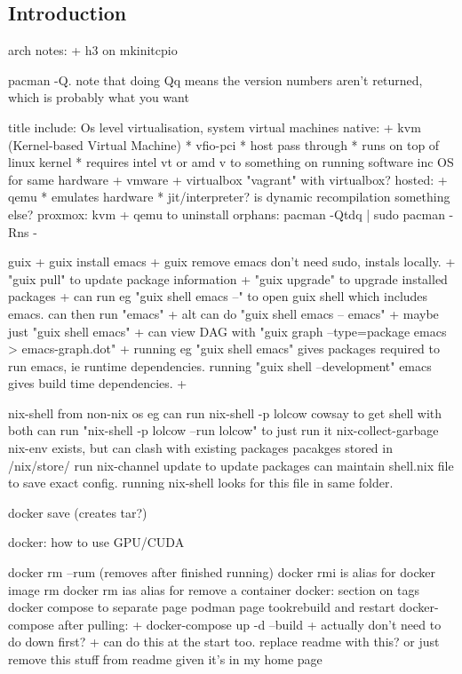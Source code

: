
\subsection{Introduction}

arch notes:
+ h3 on mkinitcpio

pacman -Q. note that doing Qq means the version numbers aren't returned, which is probably what you want


title include: Os level virtualisation, system virtual machines
native:
+ kvm (Kernel-based Virtual Machine)
  * vfio-pci
  * host pass through
  * runs on top of linux kernel
  * requires intel vt or amd v
to something on running software inc OS for same hardware
+ vmware
+ virtualbox
"vagrant" with virtualbox?
hosted:
+ qemu
  * emulates hardware
  * jit/interpreter? is dynamic recompilation something else?
proxmox: kvm + qemu
to uninstall orphans:
pacman -Qtdq | sudo pacman -Rns -


guix
+ guix install emacs
+ guix remove emacs
don't need sudo, instals locally.
+ "guix pull" to update package information
+ "guix upgrade" to upgrade installed packages
+ can run eg "guix shell emacs --" to open guix shell which includes emacs. can then run "emacs"
+ alt can do "guix shell emacs -- emacs"
+ maybe just "guix shell emacs"
+ can view DAG with "guix graph --type=package emacs > emacs-graph.dot"
+ running eg "guix shell emacs" gives packages required to run emacs, ie runtime dependencies. running "guix shell --development" emacs gives build time dependencies.
+


nix-shell from non-nix os
eg can run nix-shell -p lolcow cowsay to get shell with both
can run "nix-shell -p lolcow --run lolcow" to just run it
nix-collect-garbage
nix-env exists, but can clash with existing packages
pacakges stored in /nix/store/
run nix-channel update to update packages
can maintain shell.nix file to save exact config. running nix-shell looks for this file in same folder.

docker save (creates tar?)

docker: how to use GPU/CUDA

docker rm --rum (removes after finished running)
docker rmi is alias for docker image rm
docker rm ias alias for remove a container
docker: section on tags
docker compose to separate page
podman page tookrebuild and restart docker-compose after pulling:
+ docker-compose up -d --build
  + actually don't need to do down first?
  + can do this at the start too. replace readme with this? or just remove this stuff from readme given it's in my home page



